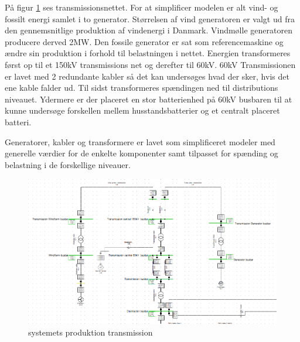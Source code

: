 På figur \ref{fig:SimTrans} ses transmissionsnettet. For at simplificer modelen er alt vind- og fossilt energi samlet i to generator. Størrelsen af vind generatoren er valgt ud fra den gennemsnitlige produktion af vindenergi i Danmark. Vindmølle generatoren producere derved 2MW. Den fossile generator er sat som referencemaskine og ændre sin produktion i forhold til belastningen i nettet. Energien transformeres først op til et 150kV transmissions net og derefter til 60kV. 60kV Transmissionen er lavet med 2 redundante kabler så det kan undersøges hvad der sker, hvis det ene kable falder ud. Til sidst transformeres spændingen ned til distributions niveauet. Ydermere er der placeret en stor batterienhed på 60kV busbaren til at kunne undersøge forskellen mellem husstandsbatterier og et centralt placeret batteri.

Generatorer, kabler og transformere er lavet som simplificeret modeler med generelle værdier for de enkelte komponenter samt tilpasset for spænding og belastning i de forskellige niveauer.
 

\begin{figure}[H] %
	\centering
	\includegraphics[width=1\textwidth]{figurer/Sim_model_1}
	\caption{systemets produktion transmission}
	\label{fig:SimTrans}
\end{figure}
